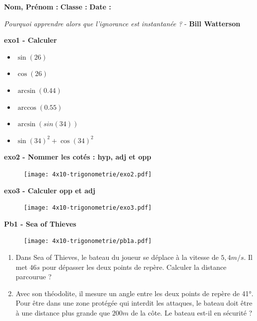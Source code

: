 



\textbf{Nom, Prénom :} \hspace{8cm} \textbf{Classe :} \hspace{3cm} \textbf{Date :}\\

\vspace{-0.5cm} \begin{center}
  \textit{Pourquoi apprendre alors que l’ignorance est instantanée ?}  - \textbf{ Bill Watterson}
\end{center}

\textbf{exo1 - Calculer}

\begin{multicols}{3}
\begin{itemize}[label={$\bullet$}]
  \item $\sin(26)$ \dotfill 
  \item $\cos(26)$ \dotfill \columnbreak
  \item $\arcsin(0.44)$ \dotfill 
  \item $\arccos(0.55)$ \dotfill \columnbreak
  \  \item $\arcsin(sin(34))$ \dotfill 
  \item $\sin(34)^2 + \cos(34)^2 $ \dotfill 
\end{itemize} 
\end{multicols}

\textbf{exo2 - Nommer les cotés : hyp, adj et opp}

\begin{figure}[H]
  \centering
  \texttt{[image: 4x10-trigonometrie/exo2.pdf]}
\end{figure}

\textbf{exo3 - Calculer opp et adj}

\begin{figure}[H]
  \centering
  \texttt{[image: 4x10-trigonometrie/exo3.pdf]}
\end{figure}

\Pointilles[3]

\begin{multicols}{2}

\textbf{Pb1 - Sea of Thieves}

\begin{figure}[H]
  \centering
  \texttt{[image: 4x10-trigonometrie/pb1a.pdf]}
\end{figure}

\begin{enumerate}
  \item Dans Sea of Thieves, le bateau du joueur se déplace à la vitesse de $5,4m/s$. Il met $46s$ pour dépasser les deux points de repère. Calculer la distance parcourue ?
  \item Avec son théodolite, il mesure un angle entre les deux points de repère de 41°. Pour être dans une zone protégée qui interdit les attaques, le bateau doit être à une distance plus grande que $200m$ de la côte. Le bateau est-il en sécurité ?
\end{enumerate} \columnbreak

\Pointilles[17]

\end{multicols}

